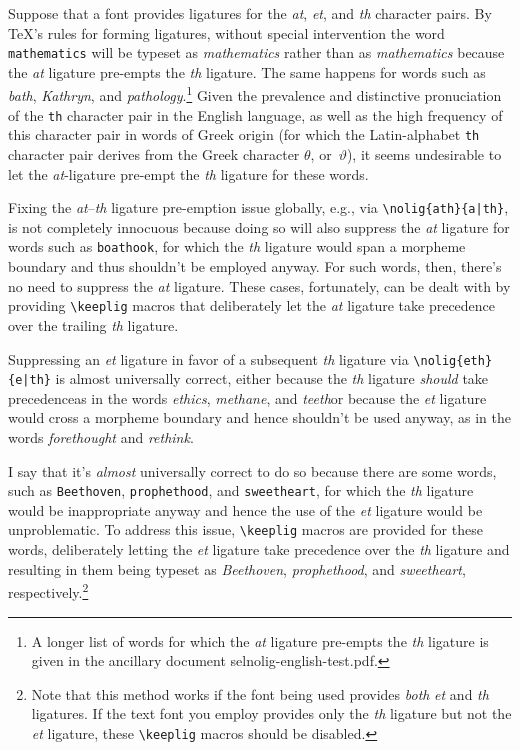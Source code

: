 \documentclass[12pt]{article}
\newcommand{\pkg}[1]{\textsf{#1}}
\newcommand{\opt}[1]{\texttt{#1}}
\newcommand{\cmmd}[1]{\texttt{\textbackslash #1}}
\begin{document}
Suppose that a font provides ligatures for the \emph{at}, \emph{et}, and \emph{th} character pairs. By \TeX's rules for forming ligatures, without special intervention the word \opt{mathematics} will be typeset as \emph{m\mbox{at}hematics} rather than as \emph{mathematics} because the \emph{at} ligature pre-empts the \emph{th} ligature. The same happens for words such as \emph{b\mbox{at}h}, \emph{K\mbox{at}hryn}, and \emph{p\mbox{at}hology}.\footnote{A longer list of words for which the \emph{at} ligature pre-empts the \emph{th} ligature is given in the ancillary document \pkg{selnolig-english-test.pdf}. }
Given the prevalence and distinctive pronuciation of the \opt{th} character pair in the English language, as well as the high frequency of this character pair in words of Greek origin (for which the Latin-alphabet \opt{th} character pair derives from the Greek character $\theta$, or~$\vartheta$), it seems undesirable to let the \emph{at}-ligature pre-empt the \emph{th} ligature for these words. 

Fixing the \emph{at}--\emph{th} ligature pre-emption issue globally, e.g., via \Verb+\nolig{ath}{a|th}+, is not completely innocuous because doing so will also suppress the \emph{at} ligature for words such as \opt{boathook}, for which the \emph{th} ligature would span a morpheme boundary and thus shouldn't be employed anyway. For such words, then, there's no need to suppress the \emph{at} ligature. These cases, fortunately, can be dealt with by providing \cmmd{keeplig} macros that deliberately let the \emph{at} ligature take precedence over the trailing \emph{th} ligature.

Suppressing an \emph{et} ligature in favor of a subsequent \emph{th} ligature via \Verb+\nolig{eth}{e|th}+ is almost universally correct, either because the \emph{th} ligature \emph{should} take precedence\textemdash as in the words \emph{ethics}, \emph{methane}, and \emph{teeth}\textemdash or because the \emph{et} ligature would cross a morpheme boundary and hence shouldn't be used anyway, as in the words \emph{forethought} and \emph{rethink}. 

I say that it's \emph{almost} universally correct to do so because there are some words, such as \opt{Beethoven}, \opt{prophethood}, and \opt{sweetheart}, for which the \emph{th} ligature would be inappropriate anyway and hence the use of the \emph{et} ligature would be unproblematic. 
To address this issue, \cmmd{keeplig} macros are provided for these words, deliberately letting the \emph{et} ligature take precedence over the \emph{th} ligature and resulting in them being typeset as \emph{Beethoven}, \emph{prophethood}, and \emph{sweetheart}, respectively.\footnote{Note that this method works if the font being used provides \emph{both} \emph{et} and \emph{th} ligatures. If the text font you employ provides only the \emph{th} ligature but not the \emph{et} ligature, these \cmmd{keeplig} macros should be disabled.}
\end{document}
